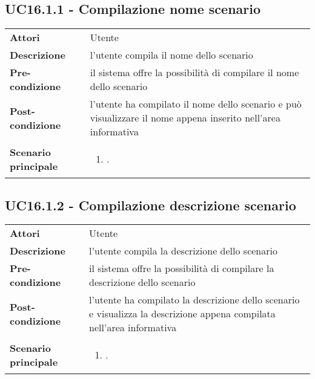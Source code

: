 \subsection{UC16.1.1 - Compilazione nome scenario} 
\label{sssec:UC16.1.1} 
\def\arraystretch{1.5}
\begin{tabularx}{\textwidth}{l|p{}}
	\rowcolor{I} \multicolumn{2}{c}{\color{white}\textbf{UC16.1.1 - Compilazione nome scenario}} \\
	\toprule
	\endhead
	\textbf{Attori} & Utente\\
	\textbf{Descrizione} & l'utente compila il nome dello scenario\\
	\textbf{Pre-condizione} & il sistema offre la possibilità di compilare il nome dello scenario\\
	\textbf{Post-condizione} & l'utente ha compilato il nome dello scenario e può visualizzare il nome appena inserito nell'area informativa\\
	\textbf{Scenario principale} & \vspace{-1.2em}\begin{enumerate}[leftmargin=*,noitemsep,nosep]
		\item \nameref{sssec:UC16.1.1}.
	\end{enumerate}\\
	\bottomrule
\end{tabularx}

\subsection{UC16.1.2 - Compilazione descrizione scenario} 
\label{sssec:UC16.1.2} 
\def\arraystretch{1.5}
\begin{tabularx}{\textwidth}{l|p{}}
	\rowcolor{I} \multicolumn{2}{c}{\color{white}\textbf{UC16.1.2 - Compilazione descrizione scenario}} \\
	\toprule
	\endhead
	\textbf{Attori} & Utente\\
	\textbf{Descrizione} & l'utente compila la descrizione dello scenario\\
	\textbf{Pre-condizione} & il sistema offre la possibilità di compilare la descrizione dello scenario\\
	\textbf{Post-condizione} & l'utente ha compilato la descrizione dello scenario e visualizza la descrizione appena compilata nell'area informativa\\
	\textbf{Scenario principale} & \vspace{-1.2em}\begin{enumerate}[leftmargin=*,noitemsep,nosep]
		\item \nameref{sssec:UC16.1.2}.
	\end{enumerate}\\
	\bottomrule
\end{tabularx}
